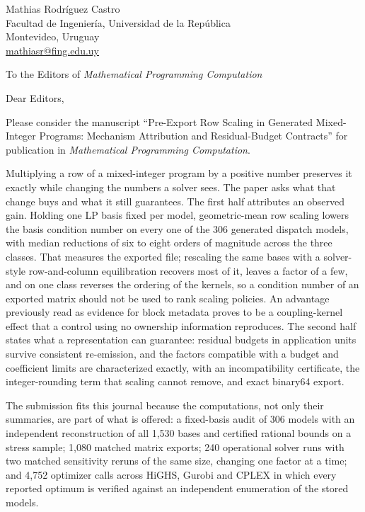 \documentclass[11pt]{article}
\begin{document}
\noindent Mathias Rodr\'iguez Castro\\
Facultad de Ingenier\'ia, Universidad de la Rep\'ublica\\
Montevideo, Uruguay\\
\href{mailto:mathiasr@fing.edu.uy}{mathiasr@fing.edu.uy}

\bigskip
\noindent To the Editors of \emph{Mathematical Programming Computation}

\bigskip
\noindent Dear Editors,

\medskip
Please consider the manuscript ``Pre-Export Row Scaling in Generated Mixed-Integer Programs:
Mechanism Attribution and Residual-Budget Contracts'' for publication in \emph{Mathematical
Programming Computation}.

Multiplying a row of a mixed-integer program by a positive number preserves it exactly while
changing the numbers a solver sees. The paper asks what that change buys and what it still
guarantees. The first half attributes an observed gain. Holding one LP basis fixed per model,
geometric-mean row scaling lowers the basis condition number on every one of the 306 generated
dispatch models, with median reductions of six to eight orders of magnitude across the three
classes. That measures the exported file; rescaling the same bases with a solver-style
row-and-column equilibration recovers most of it, leaves a factor of a few, and on one class
reverses the ordering of the kernels, so a condition number of an exported matrix should not be used to rank scaling
policies. An advantage previously read as evidence for block metadata proves to be a
coupling-kernel effect that a control using no ownership information reproduces. The second half
states what a representation can guarantee: residual budgets in application units survive
consistent re-emission, and the factors compatible with a budget and coefficient limits are
characterized exactly, with an incompatibility certificate, the integer-rounding term that
scaling cannot remove, and exact binary64 export.

The submission fits this journal because the computations, not only their summaries, are part of
what is offered: a fixed-basis audit of 306 models with an independent reconstruction of all
1{,}530 bases and certified rational bounds on a stress sample; 1{,}080 matched matrix exports;
240 operational solver runs with two matched sensitivity reruns of the same size, changing one
factor at a time; and 4{,}752 optimizer calls across HiGHS, Gurobi and CPLEX in which every
reported optimum is verified against an independent enumeration of the stored models.
\end{document}
